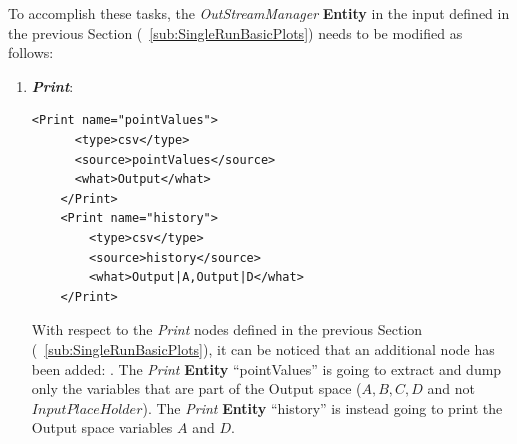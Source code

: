 To accomplish these tasks, the \textit{OutStreamManager} \textbf{Entity} in the input defined in the previous Section (~\ref{sub:SingleRunBasicPlots}) needs to be modified as follows:
\begin{enumerate}
   \item \textbf{\textit{Print}}:
   \begin{lstlisting}[style=XML,morekeywords={arg,extension,pauseAtEnd,overwrite}]
    <Print name="pointValues">
      <type>csv</type>
      <source>pointValues</source>
      <what>Output</what>
    </Print>
    <Print name="history">
        <type>csv</type>
        <source>history</source>
        <what>Output|A,Output|D</what>
    </Print>
   \end{lstlisting}   
   With respect to the \textit{Print} nodes defined in the previous Section (~\ref{sub:SingleRunBasicPlots}), it can
   be noticed that an additional node has been added: . The \textit{Print} \textbf{Entity}  
   ``pointValues'' is going to extract and dump only the variables that are part of the Output space 
   ($A,B,C,D$ and not $InputPlaceHolder$).  The \textit{Print} \textbf{Entity} ``history'' is instead going to print 
   the Output space variables $A$ and $D$. 


\end{enumerate}
